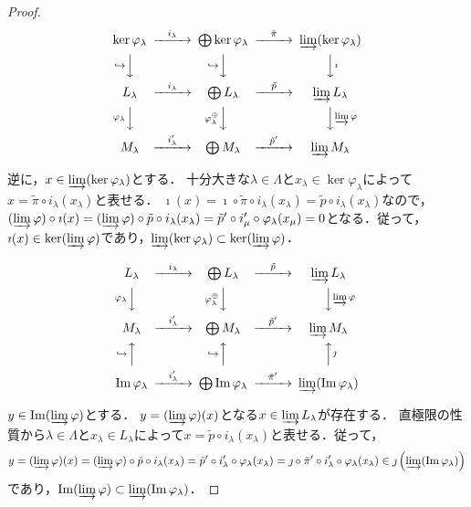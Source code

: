 \begin{proof}
  \[
  \begin{CD}
    \ker \varphi_\lambda @>{i_\lambda}>> \bigoplus \ker \varphi_\lambda @>{\tilde{\pi}}>> \varinjlim (\ker \varphi_\lambda) \\
    @V{\hookrightarrow}VV @V{\hookrightarrow}VV @VV{\imath}V \\
    L_\lambda @>{i_\lambda}>> \bigoplus L_\lambda @>{\tilde{p}}>> \varinjlim L_\lambda \\
    @V{\varphi_\lambda}VV @V{\varphi_\lambda^\oplus}VV @VV{\varinjlim \varphi}V \\
    M_\lambda @>{i_\lambda'}>> \bigoplus M_\lambda @>{\tilde{p}'}>> \varinjlim M_\lambda
  \end{CD}
  \]

  逆に，$x \in \varinjlim (\ker \varphi_\lambda)$とする．
  十分大きな$\lambda \in \Lambda$と$x_\lambda \in \ker \varphi_\lambda$によって$x = \tilde{\pi} \circ i_\lambda (x_\lambda)$と表せる．
  $\imath(x) = \imath \circ \tilde{\pi} \circ i_\lambda (x_\lambda) = \tilde{p} \circ i_\lambda (x_\lambda)$なので，$(\varinjlim \varphi) \circ \imath (x) = (\varinjlim \varphi) \circ \tilde{p} \circ i_\lambda (x_\lambda) = \tilde{p}' \circ i_\mu' \circ \varphi_\lambda (x_\mu) = 0$となる．従って，$\imath(x) \in \ker (\varinjlim \varphi)$であり，$\varinjlim (\ker \varphi_\lambda) \subset \ker (\varinjlim \varphi)$．

  \[
  \begin{CD}
    L_\lambda @>{i_\lambda}>> \bigoplus L_\lambda @>{\tilde{p}}>> \varinjlim L_\lambda \\
    @V{\varphi_\lambda}VV @V{\varphi_\lambda^\oplus}VV @VV{\varinjlim \varphi}V \\
    M_\lambda @>{i_\lambda'}>> \bigoplus M_\lambda @>{\tilde{p}'}>> \varinjlim M_\lambda \\
    @A{\hookrightarrow}AA @A{\hookrightarrow}AA @AA{\jmath}A \\
    \Im \varphi_\lambda @>{i_\lambda'}>> \bigoplus \Im \varphi_\lambda @>{\tilde{\pi}'}>> \varinjlim (\Im \varphi_\lambda)
  \end{CD}
  \]

  $y \in \Im (\varinjlim \varphi)$とする．
  $y = (\varinjlim \varphi)(x)$となる$x \in \varinjlim L_\lambda$が存在する．
  直極限の性質から$\lambda \in \Lambda$と$x_\lambda \in L_\lambda$によって$x = \tilde{p} \circ i_\lambda (x_\lambda)$と表せる．従って，
  \[y = (\varinjlim \varphi)(x) = (\varinjlim \varphi) \circ \tilde{p} \circ i_\lambda (x_\lambda) = \tilde{p}' \circ i_\lambda' \circ \varphi_\lambda (x_\lambda) = \jmath \circ \tilde{\pi}' \circ i_\lambda' \circ \varphi_\lambda (x_\lambda) \in \jmath \left( \varinjlim (\Im \varphi_\lambda) \right) \]
  であり，$\Im (\varinjlim \varphi) \subset \varinjlim (\Im \varphi_\lambda)$．


\end{proof}
